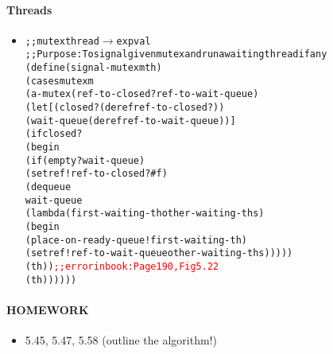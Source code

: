 \documentclass{beamer}
\newcommand{\arrow}{\(\rightarrow\)}
\begin{document}
\begin{frame}[fragile]
\framesubtitle{Threads}
\begin{scriptsize}
\begin{itemize}
\item<1-> 
\begin{alltt}
;; mutex thread \arrow{} expval
;; Purpose: To signal given mutex and run a waiting thread if any
(define (signal-mutex m th)
 (cases mutex m
  (a-mutex (ref-to-closed? ref-to-wait-queue)
   (let [(closed? (deref ref-to-closed?))
         (wait-queue (deref ref-to-wait-queue))]
    (if closed?
        (begin
         (if (empty? wait-queue)
             (setref! ref-to-closed? #f)
             (dequeue 
               wait-queue
               (lambda (first-waiting-th other-waiting-ths)
                (begin
                 (place-on-ready-queue! first-waiting-th)
                 (setref! ref-to-wait-queue other-waiting-ths)))))
         (th)) \textcolor{red}{;;error in book: Page 190, Fig 5.22}
        (th))))))
\end{alltt}

\end{itemize}
\end{scriptsize}
\end{frame}

\begin{frame}[fragile]
\framesubtitle{HOMEWORK}
\begin{scriptsize}
\begin{itemize}
\item<1-> 5.45, 5.47, 5.58 (outline the algorithm!)


\end{itemize}
\end{scriptsize}
\end{frame}
\end{document}
